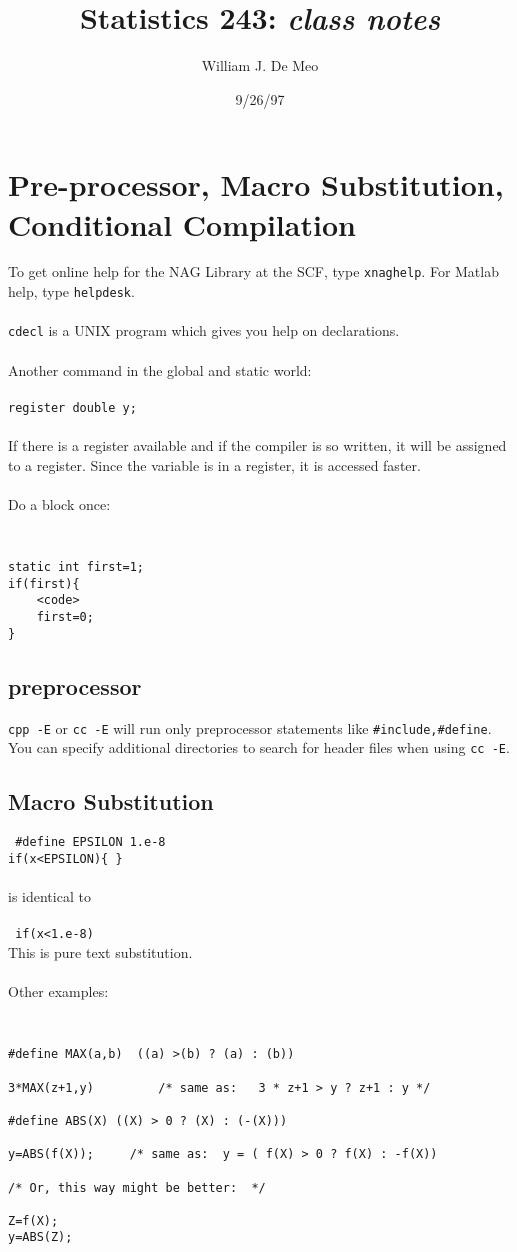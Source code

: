 \documentclass{article}
\begin{document}
\title{Statistics 243: \emph{class notes}}
\author{William J. De Meo}
\date{9/26/97 }
\maketitle
\section{Pre-processor, Macro Substitution, Conditional Compilation}
To get online help for the NAG Library at the SCF, type {\tt xnaghelp}.
For Matlab help, type {\tt helpdesk}.
\\\\
{\tt cdecl} is a UNIX program which gives you help on declarations.
\\\\
Another command in the global and static world:
\\\\
{\tt register double y;}
\\\\
If there is a register available and if the compiler is so written, it will 
be assigned to a register.  Since the variable is in a register, it is
accessed faster. 
\\\\
Do a block once:
{\tt
\begin{verbatim}
static int first=1;
if(first){
    <code>
    first=0;
}
\end{verbatim}
}
\subsection{preprocessor}
{\tt cpp -E} or {\tt cc -E} will run only preprocessor statements like
{\tt \#include,\#define}.  You can specify additional directories to
search for header files when using {\tt cc -E}.

\subsection{Macro Substitution}
{\tt
\#define EPSILON 1.e-8\\
if(x<EPSILON)\{ \}}
\\\\
is identical to \\\\
{\tt
if(x<1.e-8)}
\\
This is pure text substitution.
\\\\
Other examples:
{\tt
\begin{verbatim}
#define MAX(a,b)  ((a) >(b) ? (a) : (b))

3*MAX(z+1,y)         /* same as:   3 * z+1 > y ? z+1 : y */

#define ABS(X) ((X) > 0 ? (X) : (-(X)))

y=ABS(f(X));     /* same as:  y = ( f(X) > 0 ? f(X) : -f(X))

/* Or, this way might be better:  */

Z=f(X);
y=ABS(Z);
\end{verbatim}
}
\end{document}
